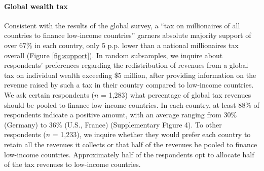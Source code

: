 \documentclass{nature}
\makeatletter
\renewenvironment*{figure}{\@float{figure}}{\end@float}
\makeatother
\begin{document}



\paragraph{Global wealth tax}\label{subsubsec:support_global_wealth_tax} %

Consistent with the results of the global survey, a ``tax on millionaires of all countries to finance low-income countries'' garners absolute majority support of over 67\% in each country, only 5 p.p. lower than a national millionaires tax overall (Figure \ref{fig:support}). In random subsamples, we inquire about respondents' preferences regarding the redistribution of revenues from a global tax on individual wealth exceeding \$5 million, after providing information on the revenue raised by such a tax in their country compared to low-income countries. %
We ask certain respondents ($n$ = 1,283) what percentage of global tax revenues should be pooled to finance low-income countries. In each country, at least 88\% of respondents indicate a positive amount, with an average ranging from 30\% (Germany) to 36\% (U.S., France) (Supplementary Figure 4). To other respondents ($n$ = 1,233), we inquire whether they would prefer each country to retain all the revenues it collects or that half of the revenues be pooled to finance low-income countries. Approximately half of the respondents opt to allocate half of the tax revenues to low-income countries.
\end{document}
